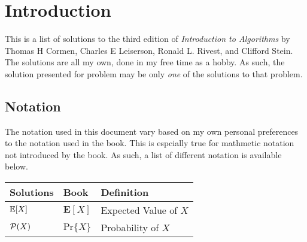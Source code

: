 \documentclass[../Algorithms]{subfiles}
\begin{document}
	\chapter*{Introduction}

	This is a list of solutions to the third edition of \textit{Introduction to Algorithms} by Thomas H Cormen, Charles E Leiserson, Ronald L. Rivest, and Clifford Stein. The solutions are all my own, done in my free time as a hobby. As such, the solution presented for problem may be only \textit{one} of the solutions to that problem.

	\section*{Notation}

	The notation used in this document vary based on my own personal preferences to the notation used in the book. This is espcially true for mathmetic notation not introduced by the book. As such, a list of different notation is available below.
	
	\begin{table}[ht]
		\begin{tabular}{l | l | l}
			\textbf{Solutions} & \textbf{Book} & \textbf{Definition}\\
			\hline
			$\mathbb{E}[X]$ & $\mathbf{E}[X]$ & Expected Value of $X$\\
			$\mathcal{P}(X)$ & $\mathrm{Pr}\{X\}$ & Probability of $X$
		\end{tabular}
	\end{table}
	
\end{document}
